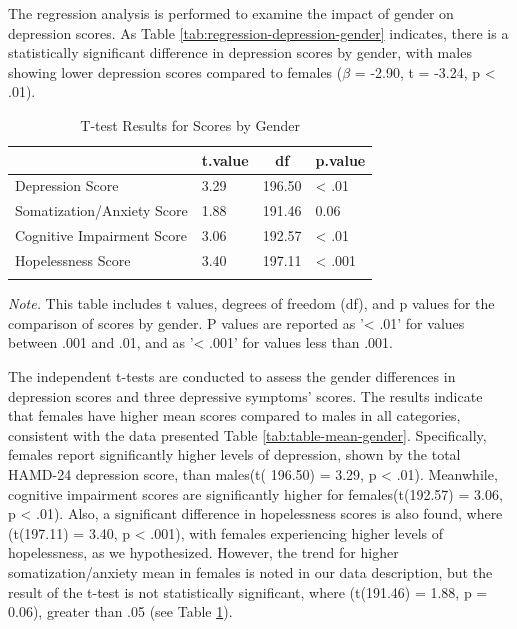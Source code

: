 \documentclass[
  man,floatsintext]{apa6}
\begin{document}
The regression analysis is performed to examine the impact of gender on depression scores. As Table \ref{tab:regression-depression-gender} indicates, there is a statistically significant difference in depression scores by gender, with males showing lower depression scores compared to females (\(\beta\) = -2.90, t = -3.24, p \textless{} .01).

\begin{table}[tbp]

\begin{center}
\begin{threeparttable}

\caption{\label{tab:ttest-scores-gender}T-test Results for Scores by Gender}

\begin{tabular}{llll}
\toprule
 & \multicolumn{1}{c}{t.value} & \multicolumn{1}{c}{df} & \multicolumn{1}{c}{p.value}\\
\midrule
Depression Score & 3.29 & 196.50 & < .01\\
Somatization/Anxiety Score & 1.88 & 191.46 & 0.06\\
Cognitive Impairment Score & 3.06 & 192.57 & < .01\\
Hopelessness Score & 3.40 & 197.11 & < .001\\
\bottomrule
\addlinespace
\end{tabular}

\begin{tablenotes}[para]
\normalsize{\textit{Note.} This table includes t values, degrees of freedom (df), and p values for the comparison of scores by gender. P values are reported as '< .01' for values between .001 and .01, and as '< .001' for values less than .001.}
\end{tablenotes}

\end{threeparttable}
\end{center}

\end{table}

The independent t-tests are conducted to assess the gender differences in depression scores and three depressive symptoms' scores. The results indicate that females have higher mean scores compared to males in all categories, consistent with the data presented Table \ref{tab:table-mean-gender}. Specifically, females report significantly higher levels of depression, shown by the total HAMD-24 depression score, than males(t( 196.50) = 3.29, p \textless{} .01).
Meanwhile, cognitive impairment scores are significantly higher for females(t(192.57) = 3.06, p \textless{} .01). Also, a significant difference in hopelessness scores is also found, where (t(197.11) = 3.40, p \textless{} .001), with females experiencing higher levels of hopelessness, as we hypothesized.
However, the trend for higher somatization/anxiety mean in females is noted in our data description, but the result of the t-test is not statistically significant, where (t(191.46) = 1.88, p = 0.06), greater than .05 (see Table \ref{tab:ttest-scores-gender}).
\end{document}
